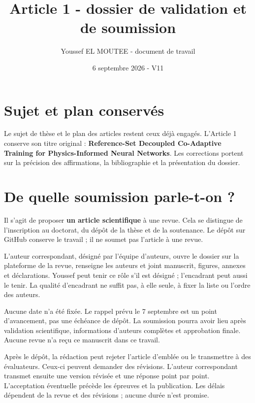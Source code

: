 \documentclass[
  11pt,
]{article}
\title{Article 1 - dossier de validation et de soumission}
\author{Youssef EL MOUTEE - document de travail}
\date{6 septembre 2026 - V11}
\begin{document}
\maketitle

\hypertarget{sujet-et-plan-conservuxe9s}{%
\section{Sujet et plan conservés}\label{sujet-et-plan-conservuxe9s}}

Le sujet de thèse et le plan des articles restent ceux déjà engagés.
L'Article 1 conserve son titre original : \textbf{Reference-Set
Decoupled Co-Adaptive Training for Physics-Informed Neural Networks}.
Les corrections portent sur la précision des affirmations, la
bibliographie et la présentation du dossier.

\hypertarget{de-quelle-soumission-parle-t-on}{%
\section{De quelle soumission parle-t-on
?}\label{de-quelle-soumission-parle-t-on}}

Il s'agit de proposer \textbf{un article scientifique} à une revue. Cela
se distingue de l'inscription au doctorat, du dépôt de la thèse et de la
soutenance. Le dépôt sur GitHub conserve le travail ; il ne soumet pas
l'article à une revue.

L'auteur correspondant, désigné par l'équipe d'auteurs, ouvre le dossier
sur la plateforme de la revue, renseigne les auteurs et joint manuscrit,
figures, annexes et déclarations. Youssef peut tenir ce rôle s'il est
désigné ; l'encadrant peut aussi le tenir. La qualité d'encadrant ne
suffit pas, à elle seule, à fixer la liste ou l'ordre des auteurs.

Aucune date n'a été fixée. Le rappel prévu le 7 septembre est un point
d'avancement, pas une échéance de dépôt. La soumission pourra avoir lieu
après validation scientifique, informations d'auteurs complètes et
approbation finale. Aucune revue n'a reçu ce manuscrit dans ce travail.

Après le dépôt, la rédaction peut rejeter l'article d'emblée ou le
transmettre à des évaluateurs. Ceux-ci peuvent demander des révisions.
L'auteur correspondant transmet ensuite une version révisée et une
réponse point par point. L'acceptation éventuelle précède les épreuves
et la publication. Les délais dépendent de la revue et des révisions ;
aucune durée n'est promise.
\end{document}
